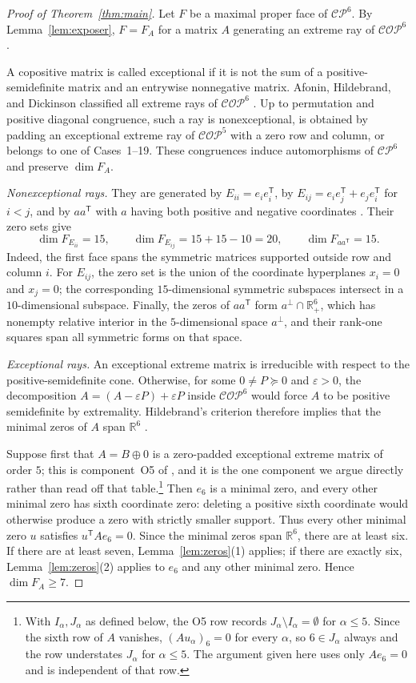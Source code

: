 \documentclass[11pt]{amsart}
\theoremstyle{remark}
\newcommand{\CP}{\mathcal{CP}}
\newcommand{\COP}{\mathcal{COP}}
\newcommand{\R}{\mathbb{R}}
\begin{document}
\begin{proof}[Proof of Theorem~\ref{thm:main}]
Let $F$ be a maximal proper face of $\CP^6$. By
Lemma~\ref{lem:exposer}, $F=F_A$ for a matrix $A$ generating an extreme ray
of $\COP^6$.

A copositive matrix is called exceptional if it is not the sum of a
positive-semidefinite matrix and an entrywise nonnegative matrix. Afonin,
Hildebrand, and Dickinson classified all extreme rays of $\COP^6$
\cite[Theorem~5.1]{AHD}. Up to permutation and positive diagonal
congruence, such a ray is nonexceptional, is obtained by padding an
exceptional extreme ray of $\COP^5$ with a zero row and column, or belongs
to one of Cases~1--19. These congruences induce automorphisms of $\CP^6$
and preserve $\dim F_A$.

\smallskip
\noindent\emph{Nonexceptional rays.}
They are generated by $E_{ii}=e_ie_i^{\mathsf T}$, by
$E_{ij}=e_ie_j^{\mathsf T}+e_je_i^{\mathsf T}$ for $i<j$, and by
$aa^{\mathsf T}$ with $a$ having both positive and negative coordinates
\cite[Section~2]{AHD}. Their zero sets give
\[
\dim F_{E_{ii}}=15,
\qquad
\dim F_{E_{ij}}=15+15-10=20,
\qquad
\dim F_{aa^{\mathsf T}}=15.
\]
Indeed, the first face spans the symmetric matrices supported outside row
and column $i$. For $E_{ij}$, the zero set is the union of the coordinate
hyperplanes $x_i=0$ and $x_j=0$; the corresponding $15$-dimensional
symmetric subspaces intersect in a $10$-dimensional subspace. Finally, the
zeros of $aa^{\mathsf T}$ form $a^\perp\cap\R_+^6$, which has nonempty
relative interior in the $5$-dimensional space $a^\perp$, and their
rank-one squares span all symmetric forms on that space.

\smallskip
\noindent\emph{Exceptional rays.}
An exceptional extreme matrix is irreducible with respect to the
positive-semidefinite cone. Otherwise, for some $0\ne P\succeq0$ and
$\varepsilon>0$, the decomposition
$A=(A-\varepsilon P)+\varepsilon P$ inside $\COP^6$ would force $A$ to be
positive semidefinite by extremality. Hildebrand's criterion therefore
implies that the minimal zeros of $A$ span $\R^6$
\cite[Theorem~4.5]{Hildebrand}.

Suppose first that $A=B\oplus0$ is a zero-padded exceptional extreme matrix
of order $5$; this is component~O5 of \cite[Table~1]{HA}, and it is the one
component we argue directly rather than read off that table.\footnote{With
$I_\alpha,J_\alpha$ as defined below, the O5 row records
$J_\alpha\setminus I_\alpha=\emptyset$ for $\alpha\le5$. Since the sixth row
of $A$ vanishes, $(Au_\alpha)_6=0$ for every $\alpha$, so $6\in J_\alpha$
always and the row understates $J_\alpha$ for $\alpha\le5$. The argument
given here uses only $Ae_6=0$ and is independent of that row.}
Then $e_6$ is a minimal zero, and every other minimal zero has
sixth coordinate zero: deleting a positive sixth coordinate would otherwise
produce a zero with strictly smaller support. Thus every other minimal zero
$u$ satisfies $u^{\mathsf T}Ae_6=0$. Since the minimal zeros span $\R^6$,
there are at least six. If there are at least seven,
Lemma~\ref{lem:zeros}(1) applies; if there are exactly six,
Lemma~\ref{lem:zeros}(2) applies to $e_6$ and any other minimal zero. Hence
$\dim F_A\ge7$.


\end{proof}
\end{document}
